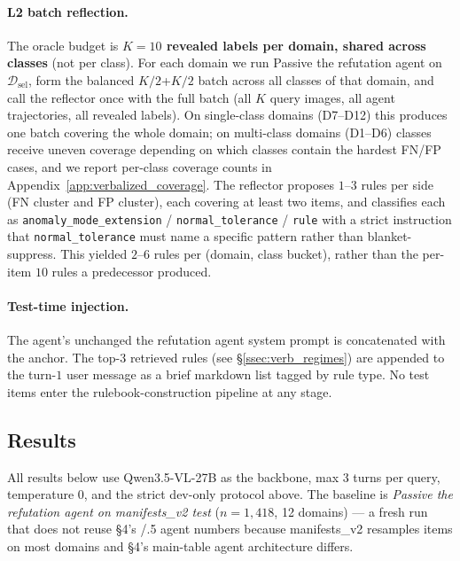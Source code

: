 \paragraph{L2 batch reflection.} The oracle budget is
\textbf{$K{=}10$ revealed labels per domain, shared across classes}
(not per class). For each domain we run Passive the refutation agent on
$\mathcal{D}_{\mathrm{sel}}$, form the balanced $K/2$+$K/2$ batch
across all classes of that domain, and call the reflector once with
the full batch (all $K$ query images, all agent trajectories, all
revealed labels). On single-class domains (D7--D12) this produces
one batch covering the whole domain; on multi-class domains (D1--D6)
classes receive uneven coverage depending on which classes contain
the hardest FN/FP cases, and we report per-class coverage counts in
Appendix~\ref{app:verbalized_coverage}. The reflector proposes
$1$--$3$ rules per side (FN cluster and FP cluster), each covering
at least two items, and classifies each as
\texttt{anomaly\_mode\_extension} / \texttt{normal\_tolerance} /
\texttt{rule} with a strict instruction that \texttt{normal\_tolerance}
must name a specific pattern rather than blanket-suppress. This
yielded $2$--$6$ rules per (domain, class bucket), rather than the
per-item $10$ rules a predecessor produced.

\paragraph{Test-time injection.} The agent's unchanged the refutation agent system
prompt is concatenated with the anchor. The top-$3$ retrieved rules
(see \S\ref{ssec:verb_regimes}) are appended to the turn-$1$ user
message as a brief markdown list tagged by rule type. No test items
enter the rulebook-construction pipeline at any stage.

\subsection{Results}
\label{ssec:verb_exp}

All results below use Qwen3.5-VL-27B as the backbone, max 3 turns
per query, temperature 0, and the strict dev-only protocol above.
The baseline is \emph{Passive the refutation agent on manifests\_v2 test}
($n{=}1{,}418$, 12 domains) — a fresh run that does not reuse §4's
/.5 agent numbers because manifests\_v2 resamples items on most
domains and §4's main-table agent architecture differs.

